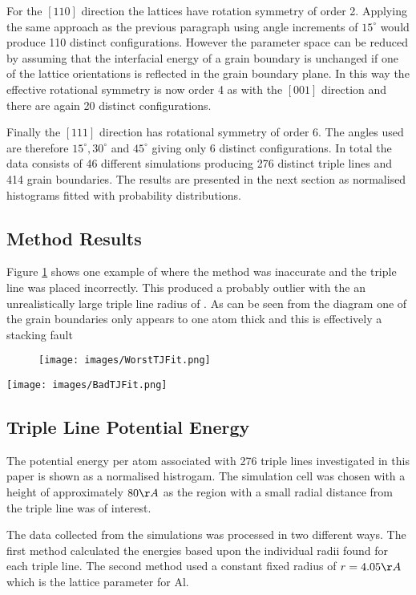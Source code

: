 \documentclass[12pt,a4paper]{book}
\begin{document}
For the $[1 1 0]$ direction the lattices have rotation symmetry of order 2. Applying the same approach as the previous paragraph using angle increments of $15^{\circ}$ would produce 110 distinct configurations. However the parameter space can be reduced by assuming that the interfacial energy of a grain boundary is unchanged if one of the lattice orientations is reflected in the grain boundary plane. In this way the effective rotational symmetry is now order 4 as with the $[0 0 1]$ direction and there are again 20 distinct configurations.  

Finally the $[1 1 1]$ direction has rotational symmetry of order 6. The angles used are therefore $15^{\circ},30^{\circ}$  and $45^{\circ}$ giving only 6 distinct configurations. In total the data consists of 46 different simulations producing 276 distinct triple lines and 414 grain boundaries. The results are presented in the next section as normalised histograms fitted with probability distributions.  

\subsection{Method Results}

Figure \ref{fig:ErrorStacking} shows one example of where the method was inaccurate and the triple line was placed incorrectly. This produced a probably outlier with the an unrealistically large triple line radius of . As can be seen from the diagram one of the grain boundaries only appears to one atom thick and this is effectively a stacking fault 

\begin{figure}
	\texttt{[image: images/WorstTJFit.png]} 
	\label{fig:ErrorStacking}
\end{figure}



\texttt{[image: images/BadTJFit.png]} 

\subsection{Triple Line Potential Energy}

The potential energy per atom associated with 276 triple lines investigated in this paper is shown as a normalised histrogam. The simulation cell was chosen with a height of approximately $80\AA$ as the region with a small radial distance from the triple line was of interest. 

The data collected from the simulations was processed in two different ways. The first method calculated the energies based upon the individual radii found for each triple line. The second method used a constant fixed radius of $r = 4.05 \AA$ which is the lattice parameter for Al.
\end{document}
